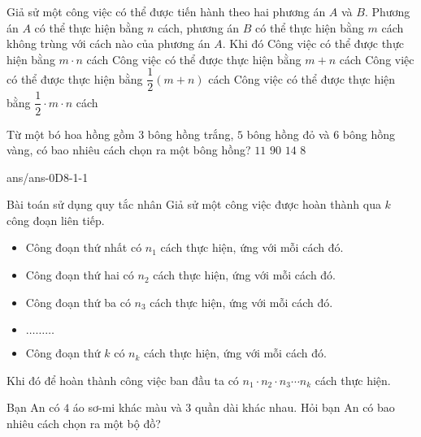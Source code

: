 \begin{ex}%
	Giả sử một công việc có thể được tiến hành theo hai phương án $A$ và $B$. Phương án $A$ có thể thực hiện bằng $n$ cách, phương án $B$ có thể thực hiện bằng $m$ cách không trùng với cách nào của phương án $A$. Khi đó
	\choice
	{Công việc có thể được thực hiện bằng $m\cdot n$ cách}
	{\True Công việc có thể được thực hiện bằng $m+n$ cách}
	{Công việc có thể được thực hiện bằng $\dfrac{1}{2}(m+n)$ cách}
	{Công việc có thể được thực hiện bằng $\dfrac{1}{2}\cdot m\cdot n$ cách}
\end{ex}


\begin{ex}%
	Từ một bó hoa hồng gồm $3$ bông hồng trắng, $5$ bông hồng đỏ và $6$ bông hồng vàng, có bao nhiêu cách chọn ra một bông hồng?
	\choice
	{$11$}
	{$90$}
	{\True $14$}
	{$8$}
\end{ex}

\begin{indapan}{10}{ans/ans-0D8-1-1}\end{indapan}
	\begin{dang}{Bài toán sử dụng quy tắc nhân}
		Giả sử một công việc được hoàn thành qua $k$ công đoạn liên tiếp.
		\begin{itemize}
			\item Công đoạn thứ nhất có $n_1$ cách thực hiện, ứng với mỗi cách đó.
			\item Công đoạn thứ hai có $n_2$ cách thực hiện, ứng với mỗi cách đó.
			\item Công đoạn thứ ba có $n_3$ cách thực hiện, ứng với mỗi cách đó.
			\item $\ldots\ldots\ldots$
			\item Công đoạn thứ $k$ có $n_k$ cách thực hiện, ứng với mỗi cách đó.
		\end{itemize}
		Khi đó để hoàn thành công việc ban đầu ta có $n_1\cdot n_2\cdot n_3 \cdots n_k$ cách thực hiện.
	\end{dang}
\viduminhhoa
\begin{vd}%
	Bạn An có $4$ áo sơ-mi khác màu và $3$ quần dài khác nhau. Hỏi bạn An có bao nhiêu cách chọn ra một bộ đồ?
\end{vd}

